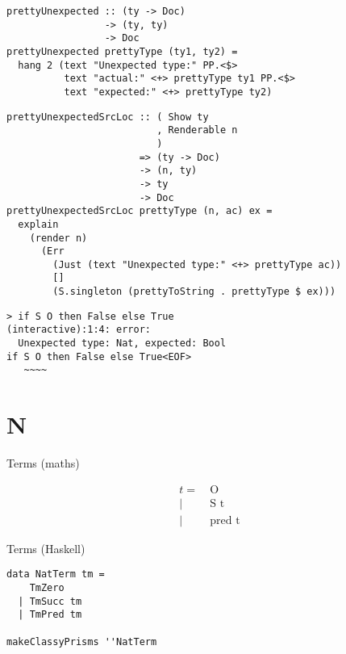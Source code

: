 \documentclass{beamer}
\begin{document}
\begin{frame}[fragile]
  \begin{verbatim}
prettyUnexpected :: (ty -> Doc)
                 -> (ty, ty)
                 -> Doc
prettyUnexpected prettyType (ty1, ty2) =
  hang 2 (text "Unexpected type:" PP.<$>
          text "actual:" <+> prettyType ty1 PP.<$>
          text "expected:" <+> prettyType ty2)
  \end{verbatim}
\end{frame} 

\begin{frame}[fragile]
  \begin{verbatim}
prettyUnexpectedSrcLoc :: ( Show ty
                          , Renderable n
                          )
                       => (ty -> Doc)
                       -> (n, ty)
                       -> ty
                       -> Doc
prettyUnexpectedSrcLoc prettyType (n, ac) ex =
  explain
    (render n)
      (Err 
        (Just (text "Unexpected type:" <+> prettyType ac)) 
        [] 
        (S.singleton (prettyToString . prettyType $ ex)))
  \end{verbatim}
\end{frame} 

\begin{frame}[fragile]
\begin{verbatim}
> if S O then False else True
(interactive):1:4: error: 
  Unexpected type: Nat, expected: Bool
if S O then False else True<EOF>
   ~~~~
\end{verbatim}
\end{frame} 

\section{N}

\begin{frame}[c]
  \begin{center}
Terms (maths) 
  \end{center}
  \begin{displaymath}
    \begin{aligned}
t =& \ \text{O} \\
  |& \ \text{S t} \\
  |& \ \text{pred t}
    \end{aligned}
  \end{displaymath}
\end{frame}

\begin{frame}[fragile]
  \begin{center}
Terms (Haskell) 
  \end{center}
  \begin{verbatim}
data NatTerm tm =
    TmZero
  | TmSucc tm
  | TmPred tm

makeClassyPrisms ''NatTerm
  \end{verbatim}
\end{frame} 
\end{document}
